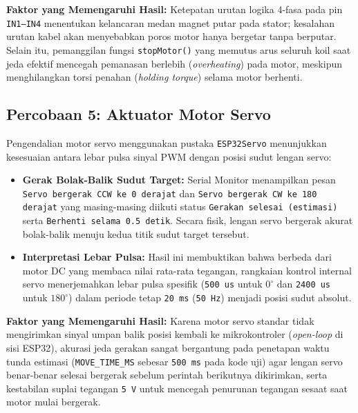 \textbf{Faktor yang Memengaruhi Hasil:} Ketepatan urutan logika 4-fasa pada pin \texttt{IN1--IN4} menentukan kelancaran medan magnet putar pada stator; kesalahan urutan kabel akan menyebabkan poros motor hanya bergetar tanpa berputar. Selain itu, pemanggilan fungsi \texttt{stopMotor()} yang memutus arus seluruh koil saat jeda efektif mencegah pemanasan berlebih (\textit{overheating}) pada motor, meskipun menghilangkan torsi penahan (\textit{holding torque}) selama motor berhenti.

\subsection{Percobaan 5: Aktuator Motor Servo}
Pengendalian motor servo menggunakan pustaka \texttt{ESP32Servo} menunjukkan kesesuaian antara lebar pulsa sinyal PWM dengan posisi sudut lengan servo:
\begin{itemize}
    \item \textbf{Gerak Bolak-Balik Sudut Target:} Serial Monitor menampilkan pesan \texttt{Servo bergerak CCW ke 0 derajat} dan \texttt{Servo bergerak CW ke 180 derajat} yang masing-masing diikuti status \texttt{Gerakan selesai (estimasi)} serta \texttt{Berhenti selama 0.5 detik}. Secara fisik, lengan servo bergerak akurat bolak-balik menuju kedua titik sudut target tersebut.
    \item \textbf{Interpretasi Lebar Pulsa:} Hasil ini membuktikan bahwa berbeda dari motor DC yang membaca nilai rata-rata tegangan, rangkaian kontrol internal servo menerjemahkan lebar pulsa spesifik (\texttt{500 us} untuk $0^\circ$ dan \texttt{2400 us} untuk $180^\circ$) dalam periode tetap \texttt{20 ms} (\texttt{50 Hz}) menjadi posisi sudut absolut.
\end{itemize}

\textbf{Faktor yang Memengaruhi Hasil:} Karena motor servo standar tidak mengirimkan sinyal umpan balik posisi kembali ke mikrokontroler (\textit{open-loop} di sisi ESP32), akurasi jeda gerakan sangat bergantung pada penetapan waktu tunda estimasi (\texttt{MOVE\_TIME\_MS} sebesar \texttt{500 ms} pada kode uji) agar lengan servo benar-benar selesai bergerak sebelum perintah berikutnya dikirimkan, serta kestabilan suplai tegangan \texttt{5 V} untuk mencegah penurunan tegangan sesaat saat motor mulai bergerak.

